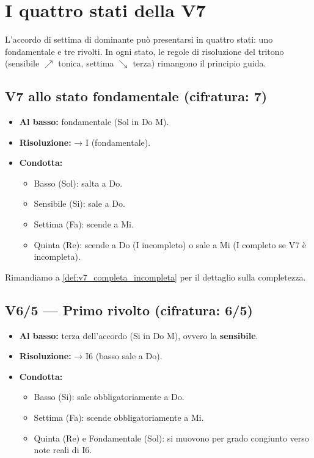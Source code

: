 \section{I quattro stati della V7}
\label{sec:stati_v7}

L'accordo di settima di dominante può presentarsi in quattro stati: uno fondamentale e tre rivolti. In ogni stato, le regole di risoluzione del tritono (sensibile $\nearrow$ tonica, settima $\searrow$ terza) rimangono il principio guida.

\subsection{V7 allo stato fondamentale (cifratura: 7)}
\begin{itemize}
    \item \textbf{Al basso:} fondamentale (Sol in Do M).
    \item \textbf{Risoluzione:} → I (fondamentale).
    \item \textbf{Condotta:} 
    \begin{itemize}
        \item Basso (Sol): salta a Do.
        \item Sensibile (Si): sale a Do.
        \item Settima (Fa): scende a Mi.
        \item Quinta (Re): scende a Do (I incompleto) o sale a Mi (I completo se V7 è incompleta).
    \end{itemize}
\end{itemize}
Rimandiamo a \ref{def:v7_completa_incompleta} per il dettaglio sulla completezza.

\subsection{V6/5 — Primo rivolto (cifratura: 6/5)}
\begin{itemize}
    \item \textbf{Al basso:} terza dell'accordo (Si in Do M), ovvero la \textbf{sensibile}.
    \item \textbf{Risoluzione:} → I6 (basso sale a Do).
    \item \textbf{Condotta:} 
    \begin{itemize}
        \item Basso (Si): sale obbligatoriamente a Do.
        \item Settima (Fa): scende obbligatoriamente a Mi.
        \item Quinta (Re) e Fondamentale (Sol): si muovono per grado congiunto verso note reali di I6.
    \end{itemize}
\end{itemize}

